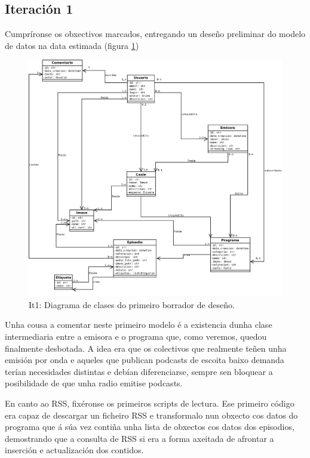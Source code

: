 \subsection{Iteración 1}

Cumpríronse os obxectivos marcados, entregando un deseño preliminar do modelo de datos na data estimada (figura \ref{fig:classold}) 

\begin{figure}[h]
	\centering
	\includegraphics[scale=0.35,keepaspectratio=true]{./images/class_diagram_20171107.png}
	\caption{It1: Diagrama de clases do primeiro borrador de deseño.}
	\label{fig:classold}
\end{figure}

Unha cousa a comentar neste primeiro modelo é a existencia dunha clase  intermediaria entre a emisora e o programa que, como veremos, quedou finalmente desbotada. A idea era que os colectivos que realmente teñen unha emisión por onda e aqueles que publican podcasts de escoita baixo demanda terían necesidades distintas e debían diferenciarse, sempre sen bloquear a posibilidade de que unha radio emitise podcasts.

En canto ao RSS, fixéronse os primeiros scripts de lectura. Ese primeiro código era capaz de descargar un ficheiro RSS e transformalo nun obxecto cos datos do programa que á súa vez contiña unha lista de obxectos cos datos dos episodios, demostrando que a consulta de RSS si era a forma axeitada de afrontar a inserción e actualización dos contidos.

